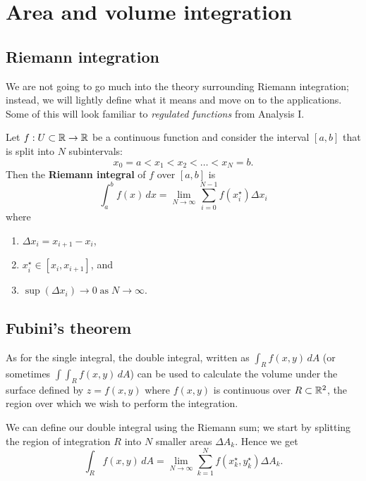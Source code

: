 \chapter{Area and volume integration}
\section{Riemann integration}

\begin{remark}
    We are not going to go much into the theory surrounding Riemann integration;
    instead, 
    we will lightly define what it means and move on to the applications.
    Some of this will look familiar to \emph{regulated functions}
    from Analysis I.
\end{remark}

\begin{definition}
    Let $f: U \subset \mathbb{R} \to \mathbb{R}$ be a continuous function
    and consider the interval $[a, b]$ that is split into $N$ subintervals:
    \[
        x_0 = a < x_1 < x_2 < \ldots < x_N = b.
    \]
    Then the \textbf{Riemann integral} of $f$ over $[a,b]$ is
    \[
        \int_a^b f(x) \, dx 
        = \lim_{N \to \infty} \sum_{i = 0}^{N - 1} f(x^\star_i) \Delta x_i
    \]
    where 
    \begin{enumerate}
        \item 
            $\Delta x_i = x_{i + 1} - x_i$, 

        \item 
            $x_i^\star \in [x_i, x_{i + 1}]$, and

        \item 
            $\sup(\Delta x_i) \to 0 \;\text{as}\; N \to \infty$.
   \end{enumerate}
\end{definition}

\section{Fubini's theorem}

As for the single integral, the double integral,
written as $\int_R f(x, y) \, dA$
(or sometimes $\int\int_R f(x, y) \, dA$)
can be used to calculate the volume under the surface defined by
$z = f(x, y)$ where $f(x, y)$ is continuous over $R \subset \mathbb{R}^2$,
the region over which we wish to perform the integration.

We can define our double integral using the Riemann sum;
we start by splitting the region of integration $R$ into
$N$ smaller areas $\Delta A_k$.
Hence we get
\[
    \int_R f(x, y) \, dA =
    \lim_{N \to \infty} \sum^{N}_{k = 1} 
    f(x^\star_k, y^\star_k) \Delta A_k.
\]


